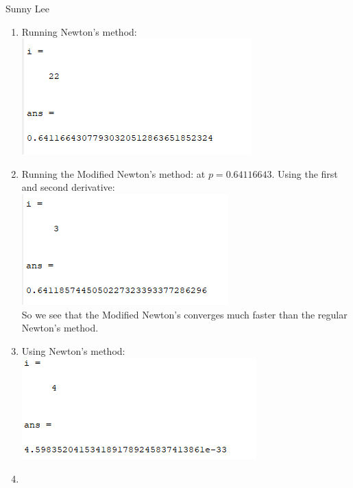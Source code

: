 \documentclass[12pt,letterpaper]{article}
\begin{document}
    Sunny Lee

    \begin{enumerate}
        \item Running Newton's method: \\
        \includegraphics{number1.png}
        \item 
        Running the Modified Newton's method:
        at $p = 0.64116643$. Using the first and second derivative: \\
        \includegraphics{number2.png}\\
        So we see that the Modified Newton's converges much faster than the regular
        Newton's method. 
        
        \item
        Using Newton's method: \\
        \includegraphics{number3.png}

        \item 

    \end{enumerate}
\end{document}
